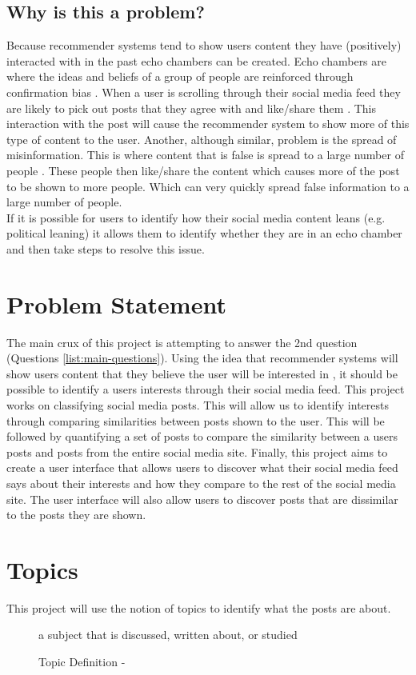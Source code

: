 \subsection{Why is this a problem?}
Because recommender systems tend to show users content they have (positively) interacted with in the past echo chambers can be created.
Echo chambers are where the ideas and beliefs of a group of people are reinforced through confirmation bias \cite{echo-chambers}.
When a user is scrolling through their social media feed they are likely to pick out posts that they agree with and like/share them \cite{collatt}\cite{misinf}.
This interaction with the post will cause the recommender system to show more of this type of content to the user.
Another, although similar, problem is the spread of misinformation. This is where content that is false is spread to a large number of people \cite{misinf}\cite{misinfspread}.
These people then like/share the content which causes more of the post to be shown to more people. Which can very quickly
spread false information to a large number of people.\\
If it is possible for users to identify how their social media content leans (e.g. political leaning) it allows them to identify
whether they are in an echo chamber and then take steps to resolve this issue.

\section{Problem Statement}
The main crux of this project is attempting to answer the 2nd question (Questions \ref{list:main-questions}). Using the idea
that recommender systems will show users content that they believe the user will be interested in \cite{twitter-rec}, it should be possible to
identify a users interests through their social media feed. This project works on classifying social media posts. This will
allow us to identify interests through comparing similarities between posts shown to the user. This will be followed by quantifying
a set of posts to compare the similarity between a users posts and posts from the entire social media site.
Finally, this project aims to create a user interface that allows users to discover what their social media feed says about their
interests and how they compare to the rest of the social media site. The user interface will also allow users to discover posts
that are dissimilar to the posts they are shown.

\section{Topics}
This project will use the notion of topics to identify what the posts are about.
\begin{figure}[hbtp]
    \centering
    a subject that is discussed, written about, or studied
    \caption{Topic Definition - \cite{cambdict}}
    \label{fig:topic_definition}
\end{figure}

